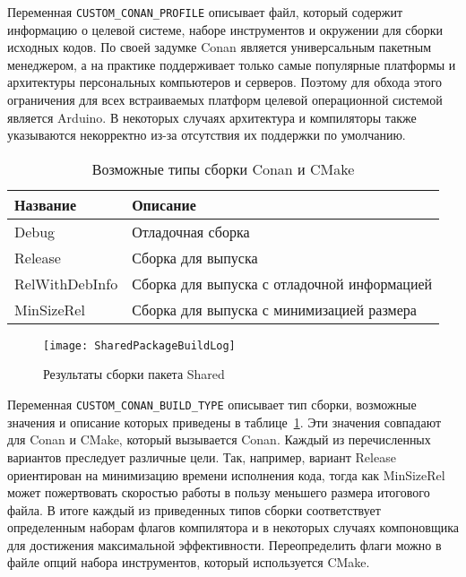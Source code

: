 Переменная \lstinline{CUSTOM_CONAN_PROFILE} описывает файл, который
содержит информацию о
целевой системе, наборе инструментов и окружении для сборки исходных кодов.
По своей задумке Conan является универсальным пакетным менеджером,
а на практике поддерживает только самые популярные платформы и архитектуры
персональных компьютеров и серверов. Поэтому для обхода этого ограничения
для всех встраиваемых платформ целевой операционной системой является Arduino.
В некоторых случаях архитектура и компиляторы также указываются некорректно из-за
отсутствия их поддержки по умолчанию.

\begin{table}[ht]
    \caption{Возможные типы сборки Conan и CMake}
    \label{table:manual:buildTypes}
    \begin{tabular}{| >{\raggedright}m{}
                    | >{\raggedright\arraybackslash}m{}|}
        \hline
        \centering Название & \centering\arraybackslash Описание \\

        \hline
        Debug &
        Отладочная сборка
        \\

        \hline
        Release &
        Сборка для выпуска
        \\

        \hline
        RelWithDebInfo &
        Сборка для выпуска с отладочной информацией
        \\

        \hline
        MinSizeRel &
        Сборка для выпуска с минимизацией размера
        \\

        \hline
    \end{tabular}
\end{table}

\fixTableSectionSpace

\begin{figure}[ht]
    \centering
    \texttt{[image: SharedPackageBuildLog]}
    \caption{Результаты сборки пакета Shared}
    \label{pic::manual::sharedPkgBuild}
\end{figure}

Переменная \lstinline{CUSTOM_CONAN_BUILD_TYPE} описывает тип сборки, возможные
значения и описание которых приведены в таблице~\ref{table:manual:buildTypes}.
Эти значения совпадают для Conan и CMake, который вызывается
Conan. Каждый из перечисленных вариантов преследует различные цели.
Так, например, вариант Release ориентирован на минимизацию времени исполнения кода,
тогда как MinSizeRel может пожертвовать скоростью работы в пользу меньшего
размера итогового файла.
В итоге каждый из приведенных типов сборки соответствует определенным наборам флагов
компилятора и в некоторых случаях компоновщика для достижения максимальной
эффективности.
Переопределить флаги можно в файле опций набора инструментов, который
используется CMake.

